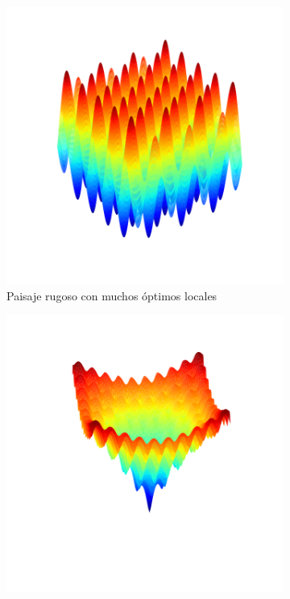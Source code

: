 \begin{figure}[H]
\begin{subfigure}{.45\textwidth}
    \includegraphics[scale=.4]{Imagenes/rugged.png}
    \caption{Paisaje rugoso con muchos óptimos locales}
\end{subfigure}
\begin{subfigure}{.5\textwidth}
    \includegraphics[scale=.4]{Imagenes/ruggedvalley.png}

\end{subfigure}
\end{figure}
